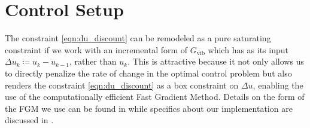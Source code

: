 \documentclass[twocolumn,twoside]{IEEEtran}
\newcommand{\Gv}{\ensuremath{G_{\text{vib}}}\xspace}
\begin{document}
\section{Control Setup}\label{sec:control_setup}
The constraint \eqref{eqn:du_discount} can be remodeled as a pure saturating constraint if we work with an incremental form of \(\Gv\) which has as its input \({\Delta u_k\coloneqq u_k-u_{k-1}}\), rather than \(u_k\). This is attractive because it not only allows us to directly penalize the rate of change in the optimal control problem but also renders the constraint \eqref{eqn:du_discount} as a box constraint on $\Delta u$, enabling the use of the computationally efficient Fast Gradient Method. Details on the form of the FGM we use can be found in \cite{Jerez_Trans_2014, jerez_embedded_2013} while specifics about our implementation are discussed in \cite{braker_application_2017}.
\end{document}
